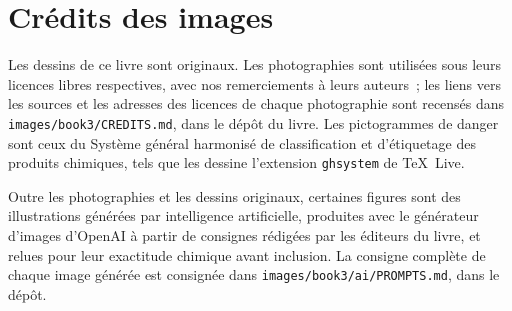 \chapter*{Crédits des images}

Les dessins de ce livre sont originaux. Les photographies sont utilisées
sous leurs licences libres respectives, avec nos remerciements à leurs
auteurs~; les liens vers les sources et les adresses des licences de
chaque photographie sont recensés dans
\texttt{images/book3/CREDITS.md}, dans le dépôt du livre.
Les pictogrammes de danger sont ceux du Système général harmonisé de
classification et d'étiquetage des produits chimiques, tels que les
dessine l'extension \texttt{ghsystem} de \TeX\ Live.

\bigskip
Outre les photographies et les dessins originaux, certaines figures sont
des illustrations générées par intelligence artificielle, produites avec
le générateur d'images d'OpenAI à partir de consignes rédigées par les
éditeurs du livre, et relues pour leur exactitude chimique avant
inclusion. La consigne complète de chaque image générée est consignée
dans \texttt{images/book3/ai/PROMPTS.md}, dans le dépôt.

